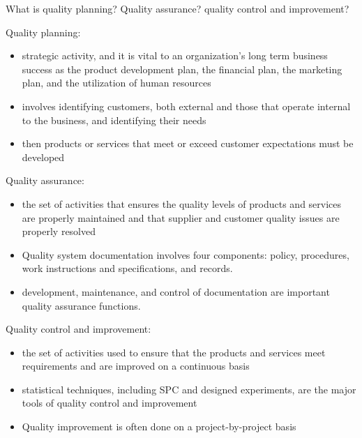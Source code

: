 What is quality planning? Quality assurance? quality control and improvement?
    
    Quality planning:
        \begin{itemize}
            \item strategic activity, and it is vital to an organization’s long term business success as the product development plan, the financial plan, the marketing plan, and the utilization of human resources

            \item involves identifying customers, both external and those that operate internal to the business, and identifying their needs   
                
            \item then products or services that meet or exceed customer expectations must be developed
        \end{itemize}
    
    Quality assurance:
        \begin{itemize}
            \item the set of activities that ensures the quality levels of products and services are properly maintained and that supplier and customer quality issues are properly resolved                
                
            \item Quality system documentation involves four components: policy, procedures, work instructions and specifications, and records. 
                
            \item development, maintenance, and control of documentation are important quality assurance functions.
        \end{itemize}

    Quality control and improvement:
        \begin{itemize}
            \item the set of activities used to ensure that the products and services meet requirements and are improved on a continuous basis 
                
            \item statistical techniques, including SPC and designed experiments, are the major tools of quality control and improvement 
                
            \item Quality improvement is often done on a project-by-project basis
        \end{itemize}
